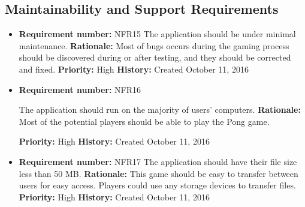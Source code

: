 \documentclass[12pt,letterpaper]{article}
\begin{document}
\subsection{Maintainability and Support Requirements}
\begin{reqbox}
	\begin{itemize}
\subsubsection{Maintenance Requirement}
	\item \textbf{Requirement number: }NFR15
	The application should be under minimal maintenance.
	\textbf{Rationale: }Most of bugs occurs during the gaming process should be discovered during or after testing, and they should be corrected and fixed.
	\textbf{Priority: }High
	\textbf{History: }Created October 11, 2016
	\end{itemize}
\end{reqbox}
\begin{reqbox}
	\begin{itemize}
\subsubsection{Supportability Requirement}
	\item \textbf{Requirement number: }NFR16
	
	 The application should run on the majority of users’ computers.
	\textbf{Rationale: }Most of the potential players should be able to play the Pong game. 
	
	\textbf{Priority: }High    
	\textbf{History: }Created October 11, 2016    
	\end{itemize}
\end{reqbox}
\begin{reqbox}
	\begin{itemize}
\subsubsection{Portability Requirement}
	\item \textbf{Requirement number: }NFR17
	The application should have their file size less than 50 MB.
	\textbf{Rationale: }This game should be easy to transfer between users for easy access. Players could use any storage devices to transfer files.
	\textbf{Priority: }High
	\textbf{History: }Created October 11, 2016
	\end{itemize}
\end{reqbox}
\end{document}

